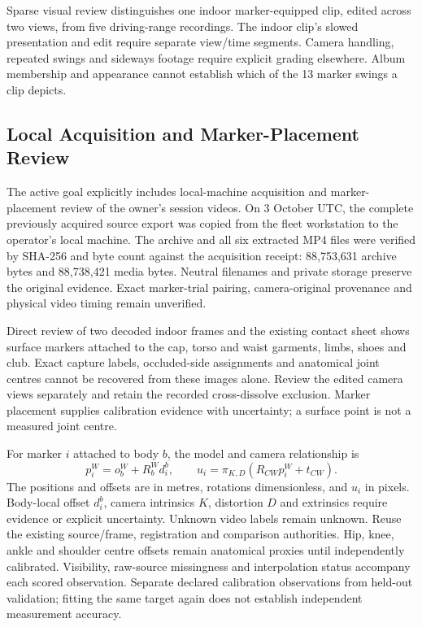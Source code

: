 \documentclass[11pt,a4paper]{article}
\begin{document}
Sparse visual review distinguishes one indoor marker-equipped clip,
edited across two views, from five driving-range recordings. The
indoor clip's slowed presentation and edit require separate view/time
segments. Camera handling, repeated swings and sideways footage require
explicit grading elsewhere. Album membership and appearance cannot
establish which of the 13 marker swings a clip depicts.

\subsection{Local Acquisition and Marker-Placement Review}
The active goal explicitly includes local-machine acquisition and
marker-placement review of the owner's session videos. On 3 October UTC,
the complete previously acquired source export was copied from the fleet
workstation to the operator's local machine. The archive and all six
extracted MP4 files were verified by SHA-256 and byte count against the
acquisition receipt: 88,753,631 archive bytes and 88,738,421 media bytes.
Neutral filenames and private storage preserve the original evidence.
Exact marker-trial pairing, camera-original provenance and physical video
timing remain unverified.

Direct review of two decoded indoor frames and the existing contact sheet
shows surface markers attached to the cap, torso and waist garments,
limbs, shoes and club. Exact capture labels, occluded-side assignments
and anatomical joint centres cannot be recovered from these images alone.
Review the edited camera views separately and retain the recorded
cross-dissolve exclusion. Marker placement supplies calibration evidence
with uncertainty; a surface point is not a measured joint centre.

For marker $i$ attached to body $b$, the model and camera relationship is
\[
 p_i^W=o_b^W+R_b^W d_i^b,\qquad
 u_i=\pi_{K,D}(R_{CW}p_i^W+t_{CW}).
\]
The positions and offsets are in metres, rotations dimensionless, and
$u_i$ in pixels. Body-local offset $d_i^b$, camera intrinsics $K$,
distortion $D$ and extrinsics require evidence or explicit uncertainty.
Unknown video labels remain unknown. Reuse the existing source/frame,
registration and comparison authorities. Hip, knee, ankle and shoulder
centre offsets remain anatomical proxies until independently calibrated.
Visibility, raw-source missingness and interpolation status accompany
each scored observation. Separate declared calibration observations from
held-out validation; fitting the same target again does not establish
independent measurement accuracy.
\end{document}
